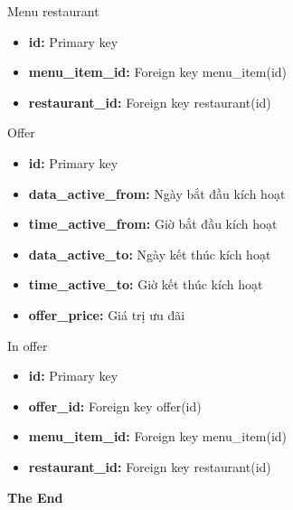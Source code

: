 \documentclass[aspectratio=43,xcolor=dvipsnames]{beamer}
\begin{document}
	\begin{frame}{Menu restaurant}
		\begin{itemize}
			\item \textbf{id:} Primary key
			\item \textbf{menu\_item\_id: } Foreign key menu\_item(id)
			\item \textbf{restaurant\_id: } Foreign key restaurant(id)
		\end{itemize}
	\end{frame}
	
	\begin{frame}{Offer}
		\begin{itemize}
			\item \textbf{id:} Primary key
			\item \textbf{data\_active\_from:} Ngày bắt đầu kích hoạt
			\item \textbf{time\_active\_from:} Giờ bắt đầu kích hoạt
			\item \textbf{data\_active\_to:} Ngày kết thúc kích hoạt
			\item \textbf{time\_active\_to:} Giờ kết thúc kích hoạt
			\item \textbf{offer\_price:} Giá trị ưu đãi
		\end{itemize}
	\end{frame}
	\begin{frame}{In offer}
		\begin{itemize}
			\item \textbf{id:} Primary key
			\item \textbf{offer\_id: } Foreign key offer(id)
			\item \textbf{menu\_item\_id: } Foreign key menu\_item(id)
			\item \textbf{restaurant\_id: } Foreign key restaurant(id)
		\end{itemize}
	\end{frame}

	
	
	\begin{frame}
		\Huge{\centerline{\textbf{The End}}}
	\end{frame}
	
	
\end{document}
